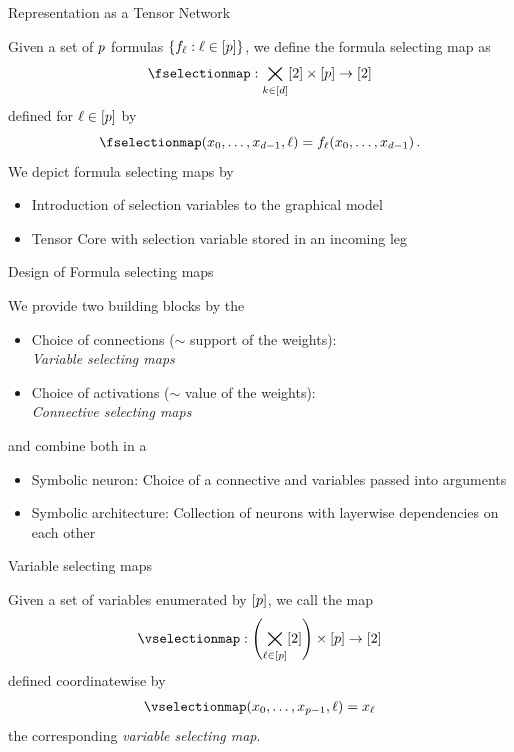 \documentclass{beamer}
\begin{document}
\begin{frame}{Representation as a Tensor Network}

Given a set of $p$ formulas $\{f_{\ell} : \ell\in[p]\}$, we define the formula selecting map as
	\[  \fselectionmap : \atomstates \times [\seldim] \rightarrow [2] \]
defined for $\ell\in[p]$ by
	\[ \fselectionmap(\atomindices,\selindex) =  \exformula_{\selindex}(\atomindices) \, . \]
\medskip
We depict formula selecting maps by


\begin{itemize}
	\item[a)] Introduction of selection variables to the graphical model
	\item[b)] Tensor Core with selection variable stored in an incoming leg
\end{itemize}

\end{frame}


\begin{frame}{Design of Formula selecting maps}

We provide two building blocks by the
\begin{itemize}
	\item Choice of connections ($\sim$ support of the weights): \\ \emph{Variable selecting maps}
	\item Choice of activations ($\sim$ value of the weights): \\ \emph{Connective selecting maps}
\end{itemize}
and combine both in a
\begin{itemize}
	\item Symbolic neuron: Choice of a connective and variables passed into arguments
	\item Symbolic architecture: Collection of neurons with layerwise dependencies on each other
\end{itemize}


\end{frame}


\begin{frame}{Variable selecting maps}

\begin{definition}
	Given a set of variables enumerated by $[p]$, we call the map
	\begin{align}
		\vselectionmap:  \left(\bigtimes_{\selindex\in[\seldim]}[2]\right) \times [\seldim]  \rightarrow [2]
	\end{align}
	defined coordinatewise by
	\begin{align}
		\vselectionmap(\atomlegindexof{0},\ldots, \atomlegindexof{\seldim-1}, \selindex) = \atomlegindexof{\selindex}
	\end{align}
	the corresponding \emph{variable selecting map}.
\end{definition}
	

\end{frame}
\end{document}

